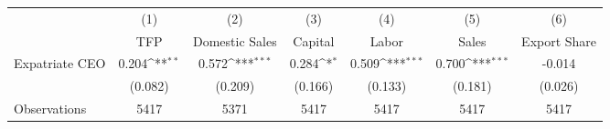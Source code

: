 {
\def\sym#1{\ifmmode^{#1}\else\(^{#1}\)\fi}
\begin{tabular}{l*{6}{c}}
\hline\hline
                    &\multicolumn{1}{c}{(1)}&\multicolumn{1}{c}{(2)}&\multicolumn{1}{c}{(3)}&\multicolumn{1}{c}{(4)}&\multicolumn{1}{c}{(5)}&\multicolumn{1}{c}{(6)}\\
                    &\multicolumn{1}{c}{TFP}&\multicolumn{1}{c}{Domestic Sales}&\multicolumn{1}{c}{Capital}&\multicolumn{1}{c}{Labor}&\multicolumn{1}{c}{Sales}&\multicolumn{1}{c}{Export Share}\\
\hline
Expatriate CEO      &       0.204\sym{**} &       0.572\sym{***}&       0.284\sym{*}  &       0.509\sym{***}&       0.700\sym{***}&      -0.014         \\
                    &     (0.082)         &     (0.209)         &     (0.166)         &     (0.133)         &     (0.181)         &     (0.026)         \\
\hline
Observations        &        5417         &        5371         &        5417         &        5417         &        5417         &        5417         \\
\hline\hline
\end{tabular}
}
